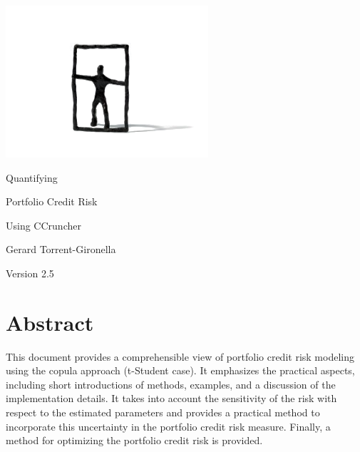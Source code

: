\documentclass[11pt,fleqn]{book} %
\def\numversion{2.5}
\begin{document}
\begingroup
\thispagestyle{empty}
\vspace*{-2.5cm}
\centerline{\includegraphics[angle=0]{./Pictures/logo.png}}
\centering
\vspace*{0.0cm}
\par\normalfont\fontsize{35}{55}\sffamily\selectfont
Quantifying\par 
Portfolio Credit Risk\par
Using CCruncher\par
\vspace*{2.0cm}
{\huge Gerard Torrent-Gironella}\par
\vspace*{2.0cm}
\par\normalfont\fontsize{18}{18}\sffamily\selectfont
Version \numversion\par
\endgroup


\newpage

 \section*{Abstract}
This document provides a comprehensible view of portfolio credit risk modeling 
using the copula approach (t-Student case). It emphasizes the practical aspects, 
including short introductions of methods, examples, and a discussion of the 
implementation details.
It takes into account the sensitivity of the risk with respect to the estimated 
parameters and provides a practical method to incorporate this uncertainty in 
the portfolio credit risk measure. Finally, a method for optimizing the 
portfolio credit risk is provided.
\end{document}
